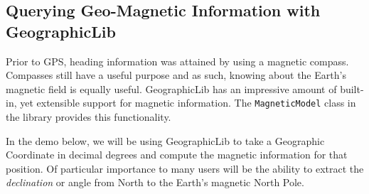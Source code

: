 %
%


\subsection*{Querying Geo-Magnetic Information with GeographicLib }

Prior to GPS, heading information was attained by using a magnetic compass.  Compasses still have a useful purpose and 
as such, knowing about the Earth's magnetic field is equally useful.  GeographicLib has an impressive amount of 
built-in, yet extensible support for magnetic information.  The \texttt{MagneticModel} class in the library provides
this functionality. 

In the demo below, we will be using GeographicLib to take a Geographic Coordinate in decimal degrees
and compute the magnetic information for that position.  Of particular importance to many users will
be the ability to extract the \emph{declination} or angle from North to the Earth's magnetic North Pole.




